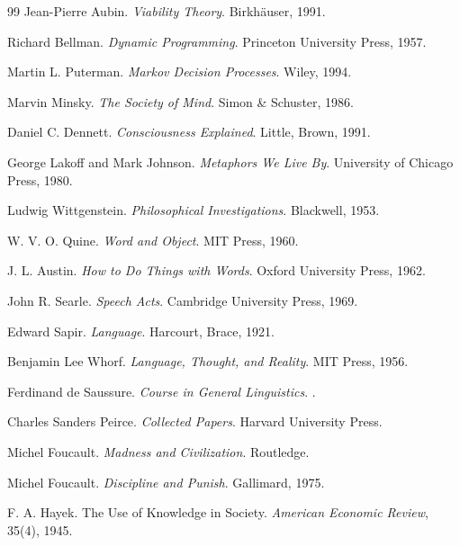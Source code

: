 \documentclass[12pt,a4paper]{article}
\begin{document}
\begin{thebibliography}{99}
Jean-Pierre Aubin.
\newblock \emph{Viability Theory}.
\newblock Birkhäuser, 1991.

Richard Bellman.
\newblock \emph{Dynamic Programming}.
\newblock Princeton University Press, 1957.

Martin L. Puterman.
\newblock \emph{Markov Decision Processes}.
\newblock Wiley, 1994.

Marvin Minsky.
\newblock \emph{The Society of Mind}.
\newblock Simon \& Schuster, 1986.

Daniel C. Dennett.
\newblock \emph{Consciousness Explained}.
\newblock Little, Brown, 1991.

George Lakoff and Mark Johnson.
\newblock \emph{Metaphors We Live By}.
\newblock University of Chicago Press, 1980.

Ludwig Wittgenstein.
\newblock \emph{Philosophical Investigations}.
\newblock Blackwell, 1953.

W. V. O. Quine.
\newblock \emph{Word and Object}.
\newblock MIT Press, 1960.

J. L. Austin.
\newblock \emph{How to Do Things with Words}.
\newblock Oxford University Press, 1962.

John R. Searle.
\newblock \emph{Speech Acts}.
\newblock Cambridge University Press, 1969.

Edward Sapir.
\newblock \emph{Language}.
\newblock Harcourt, Brace, 1921.

Benjamin Lee Whorf.
\newblock \emph{Language, Thought, and Reality}.
\newblock MIT Press, 1956.

Ferdinand de Saussure.
\newblock \emph{Course in General Linguistics}.
.

Charles Sanders Peirce.
\newblock \emph{Collected Papers}.
\newblock Harvard University Press.

Michel Foucault.
\newblock \emph{Madness and Civilization}.
\newblock Routledge.

Michel Foucault.
\newblock \emph{Discipline and Punish}.
\newblock Gallimard, 1975.

F. A. Hayek.
\newblock The Use of Knowledge in Society.
\newblock \emph{American Economic Review}, 35(4), 1945.


\end{thebibliography}
\end{document}
